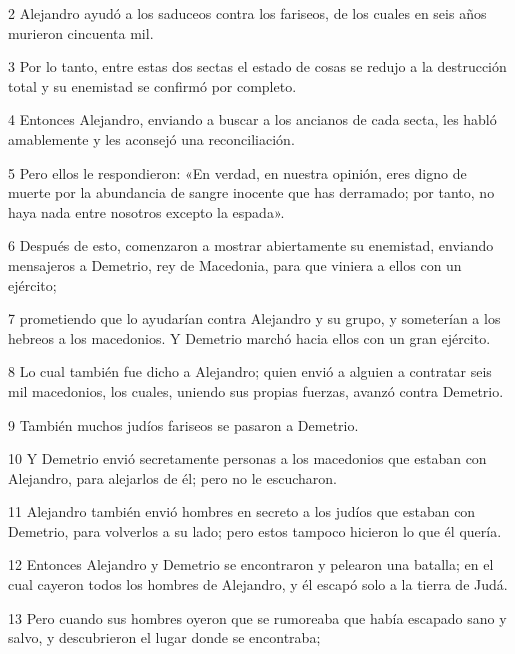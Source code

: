 \par 2 Alejandro ayudó a los saduceos contra los fariseos, de los cuales en seis años murieron cincuenta mil.

\par 3 Por lo tanto, entre estas dos sectas el estado de cosas se redujo a la destrucción total y su enemistad se confirmó por completo.

\par 4 Entonces Alejandro, enviando a buscar a los ancianos de cada secta, les habló amablemente y les aconsejó una reconciliación.

\par 5 Pero ellos le respondieron: «En verdad, en nuestra opinión, eres digno de muerte por la abundancia de sangre inocente que has derramado; por tanto, no haya nada entre nosotros excepto la espada».

\par 6 Después de esto, comenzaron a mostrar abiertamente su enemistad, enviando mensajeros a Demetrio, rey de Macedonia, para que viniera a ellos con un ejército;

\par 7 prometiendo que lo ayudarían contra Alejandro y su grupo, y someterían a los hebreos a los macedonios. Y Demetrio marchó hacia ellos con un gran ejército.

\par 8 Lo cual también fue dicho a Alejandro; quien envió a alguien a contratar seis mil macedonios, los cuales, uniendo sus propias fuerzas, avanzó contra Demetrio.

\par 9 También muchos judíos fariseos se pasaron a Demetrio.

\par 10 Y Demetrio envió secretamente personas a los macedonios que estaban con Alejandro, para alejarlos de él; pero no le escucharon.

\par 11 Alejandro también envió hombres en secreto a los judíos que estaban con Demetrio, para volverlos a su lado; pero estos tampoco hicieron lo que él quería.

\par 12 Entonces Alejandro y Demetrio se encontraron y pelearon una batalla; en el cual cayeron todos los hombres de Alejandro, y él escapó solo a la tierra de Judá.

\par 13 Pero cuando sus hombres oyeron que se rumoreaba que había escapado sano y salvo, y descubrieron el lugar donde se encontraba;

